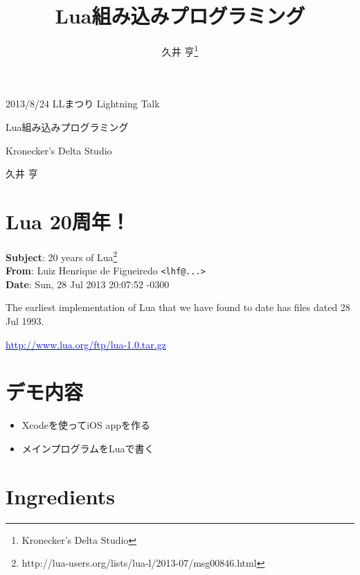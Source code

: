 \documentclass[slide,papersize]{jsarticle}
\newcommand{\link}[1]{\textcolor[named]{Blue}{\underline{#1}}}
\begin{document}
\title{Lua組み込みプログラミング}
\author{久井 亨\thanks{Kronecker's Delta Studio}}


\begin{flushright}
 {\small 2013/8/24 LLまつり Lightning Talk}
\end{flushright}

\vspace*{0.8cm}
\begin{center}
 {\Large Lua組み込みプログラミング}

\vspace*{0.3cm}

Kronecker's Delta Studio

\vspace*{0.1cm}

{\large 久井 亨}

\end{center}


\section*{Lua 20周年！}


{\scriptsize
\textbf{Subject}: 20 years of Lua\footnote{http://lua-users.org/lists/lua-l/2013-07/msg00846.html}\\
\textbf{From}: Luiz Henrique de Figueiredo \texttt{<lhf@...>}\\
\textbf{Date}: Sun, 28 Jul 2013 20:07:52 -0300\\
}


\begin{center}
The earliest implementation of Lua that we have found to date has files
dated 28 Jul 1993.

\vspace*{0.2cm}

\link{http://www.lua.org/ftp/lua-1.0.tar.gz}
\end{center}


\section*{デモ内容}

\begin{itemize}
 \item Xcodeを使ってiOS appを作る
 \item メインプログラムをLuaで書く
\end{itemize}


\section*{Ingredients}
\end{document}
